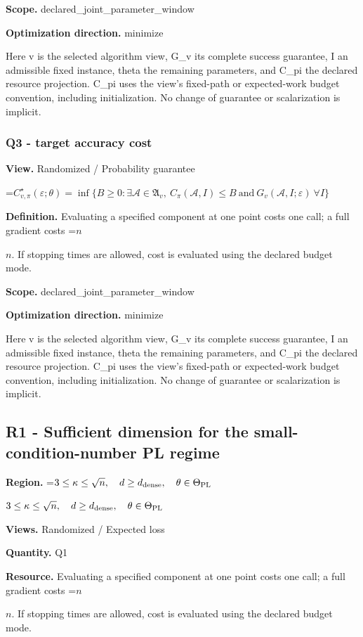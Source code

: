 \documentclass[10pt,a4paper]{article}
\newcommand{\AtlasMath}[1]{\par\begingroup\centering\setbox0=\hbox{$\displaystyle #1$}\ifdim\wd0>1.4\linewidth\typeout{ATLAS WIDE FORMULA: \the\wd0}\fi\ifdim\wd0>\linewidth\resizebox{\linewidth}{!}{\box0}\else\box0\fi\par\endgroup}
\newcommand{\AtlasInlineMath}[1]{\begingroup\setbox0=\hbox{$#1$}\ifdim\wd0>.4\linewidth\endgroup\AtlasMath{#1}\else\endgroup$#1$\fi}
\begin{document}
\textbf{Scope.} declared\_joint\_parameter\_window

\textbf{Optimization direction.} minimize

Here v is the selected algorithm view, G\_v its complete success guarantee, I an admissible fixed instance, theta the remaining parameters, and C\_pi the declared resource projection. C\_pi uses the view's fixed-path or expected-work budget convention, including initialization. No change of guarantee or scalarization is implicit.

\subsubsection{Q3 - target accuracy cost}
\textbf{View.} Randomized / Probability guarantee

\AtlasMath{C^\star_{v,\pi}(\varepsilon;\theta)=\inf\{B\ge0:\exists\mathcal A\in\mathfrak A_v,\ C_\pi(\mathcal A,I)\le B\ \text{and}\ G_v(\mathcal A,I;\varepsilon)\ \forall I\}}
\textbf{Definition.} Evaluating a specified component at one point costs one call; a full gradient costs \AtlasInlineMath{n}. If stopping times are allowed, cost is evaluated using the declared budget mode.

\textbf{Scope.} declared\_joint\_parameter\_window

\textbf{Optimization direction.} minimize

Here v is the selected algorithm view, G\_v its complete success guarantee, I an admissible fixed instance, theta the remaining parameters, and C\_pi the declared resource projection. C\_pi uses the view's fixed-path or expected-work budget convention, including initialization. No change of guarantee or scalarization is implicit.

\subsection{R1 - Sufficient dimension for the small-condition-number PL regime}
\textbf{Region.} \AtlasInlineMath{3\le\kappa\le\sqrt n,\quad d\ge d_{\rm dense},\quad\theta\in\Theta_{\rm PL}}

\textbf{Views.} Randomized / Expected loss

\textbf{Quantity.} Q1

\textbf{Resource.} Evaluating a specified component at one point costs one call; a full gradient costs \AtlasInlineMath{n}. If stopping times are allowed, cost is evaluated using the declared budget mode.
\end{document}
